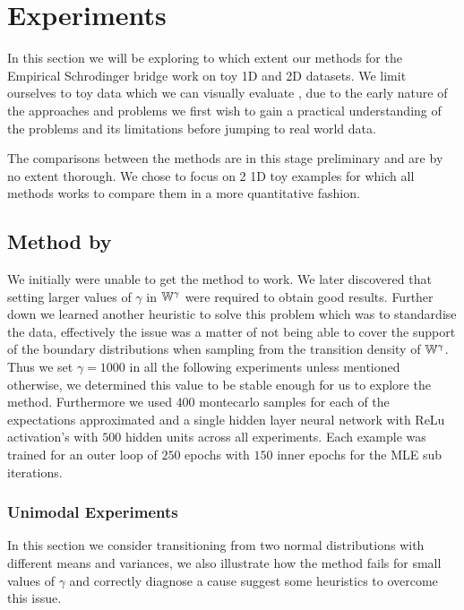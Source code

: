 \documentclass[a4paper,12pt,twoside,openright]{report}
\theoremstyle{definition}
\begin{document}
\chapter{Experiments}

In this section we will be exploring to which extent our methods for the Empirical Schrodinger bridge work on toy 1D and 2D datasets. We limit ourselves to toy data which we can visually evaluate , due to the early nature of the approaches and problems we first wish to gain a practical understanding of the problems and its limitations before jumping to real world data. 

The comparisons between the methods are in this stage preliminary and are by no extent thorough. We chose to focus on 2 1D toy examples for which all methods works to compare them in a more quantitative fashion.

\section{Method by \cite{pavon2018data}}

We initially were unable to get the method \cite{pavon2018data} to work. We later discovered that setting larger values of $\gamma$ in $\mathbb{W}^{\gamma}$ were required to obtain good results. Further down we learned another heuristic to solve this problem which was to standardise the data, effectively the issue was a matter of not being able to cover the support of the boundary distributions when sampling from the transition density of $\mathbb{W}^{\gamma}$. Thus we set $\gamma=1000$ in all the following experiments unless mentioned otherwise, we determined this value to be stable enough for us to explore the method. Furthermore we used $400$ montecarlo samples for each of the expectations approximated and a single hidden layer neural network with ReLu activation's with $500$ hidden units across all experiments. Each example was trained for an outer loop of $250$ epochs with $150$ inner epochs for the MLE sub iterations.

\subsection{Unimodal Experiments}

In this section we consider transitioning from two normal distributions with different means and variances, we also illustrate how the method fails for small values of $\gamma$ and correctly diagnose a cause suggest some heuristics to overcome this issue. 
\end{document}
